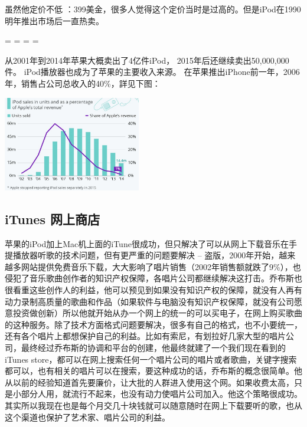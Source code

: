 虽然他定价不低
：399美金，很多人觉得这个定价当时是过高的。但是iPod在1990明年推出市场后一直热卖。

\begin{description}
\tightlist
\item[]
= = = =
\end{description}

从2001年到2014年苹果大概卖出了4亿件iPod，
2015年后还继续卖出50,000,000件。 iPod播放器也成为了苹果的主要收入来源。
在苹果推出iPhone前一年，2006年，销售占公司总收入的40\%，詳见下图：


\includegraphics[width=6cm]{IPodRiseFallScreenshot_2023-07-22_164335.jpg}

\hypertarget{itunes-ux7f51ux4e0aux5546ux5e97}{%
\subsection{iTunes 网上商店}\label{itunes-ux7f51ux4e0aux5546ux5e97}}

苹果的iPod加上Mac机上面的iTune很成功，但只解决了可以从网上下载音乐在手提播放器听歌的技术问题，但有更严重的问题要解决
--
盗版，2000年开始，越来越多网站提供免费音乐下载，大大影响了唱片销售（2002年销售额就跌了9\%），也侵犯了音乐歌曲创作者的知识产权保障，各唱片公司都继续解决这打击。乔布斯也很看重这些创作人的利益，他可以预见到如果没有知识产权的保障，就没有人再有动力录制高质量的歌曲和作品（如果软件与电脑没有知识产权保障，就没有公司愿意投资做创新）所以他就开始从办一个网上的统一的可以买电子，在网上购买歌曲的这种服务。除了技术方面格式问题要解决，很多有自己的格式，也不小要统一，还有各个唱片上都想保护自己的利益。比如有索尼，有划拉好几家大型的唱片公司，最终经过乔布斯的协调和平台的创建，他最终就建了一个我们现在看到的iTunes
store，都可以在网上搜索任何一个唱片公司的唱片或者歌曲，关键字搜索都可以，也有相关的唱片可以在搜索，要这种成功的话，乔布斯的概念很简单。他从以前的经验知道首先要廉价，让大批的人群进入使用这个网。如果收费太高，只是小部分人用，就流行不起来，也没有动力使唱片公司加入。他这个策略很成功。其实所以我现在也是每个月交几十块钱就可以随意随时在网上下载要听的歌，也从这个渠道也保护了艺术家、唱片公司的利益。

